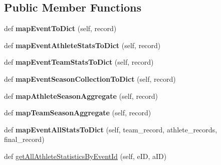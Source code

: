 \subsection*{Public Member Functions}
\begin{DoxyCompactItemize}
\item 
\mbox{\label{classhandler_1_1soccer__event_1_1_soccer_event_handler_a43777fea6c41bae4d2f21c4232f251d8}} 
def {\bfseries map\+Event\+To\+Dict} (self, record)
\item 
\mbox{\label{classhandler_1_1soccer__event_1_1_soccer_event_handler_a0036dccdeb82d763f73a053a7a773f38}} 
def {\bfseries map\+Event\+Athlete\+Stats\+To\+Dict} (self, record)
\item 
\mbox{\label{classhandler_1_1soccer__event_1_1_soccer_event_handler_af82518fe1fb1ebca7aa5beee9b4405e9}} 
def {\bfseries map\+Event\+Team\+Stats\+To\+Dict} (self, record)
\item 
\mbox{\label{classhandler_1_1soccer__event_1_1_soccer_event_handler_ad1c5202c669e10777047f798e89431e2}} 
def {\bfseries map\+Event\+Season\+Collection\+To\+Dict} (self, record)
\item 
\mbox{\label{classhandler_1_1soccer__event_1_1_soccer_event_handler_a00bca5bb080a66ca931a45ff7f00231d}} 
def {\bfseries map\+Athlete\+Season\+Aggregate} (self, record)
\item 
\mbox{\label{classhandler_1_1soccer__event_1_1_soccer_event_handler_a953f672f27801ba0e06f713fc760fc5d}} 
def {\bfseries map\+Team\+Season\+Aggregate} (self, record)
\item 
\mbox{\label{classhandler_1_1soccer__event_1_1_soccer_event_handler_ad6931bdd43e45aa2e4867ab34f64796c}} 
def {\bfseries map\+Event\+All\+Stats\+To\+Dict} (self, team\+\_\+record, athlete\+\_\+records, final\+\_\+record)
\item 
def \hyperlink{classhandler_1_1soccer__event_1_1_soccer_event_handler_aae926243409f46541c7d156081319527}{get\+All\+Athlete\+Statistics\+By\+Event\+Id} (self, e\+ID, a\+ID)

\end{DoxyCompactItemize}
